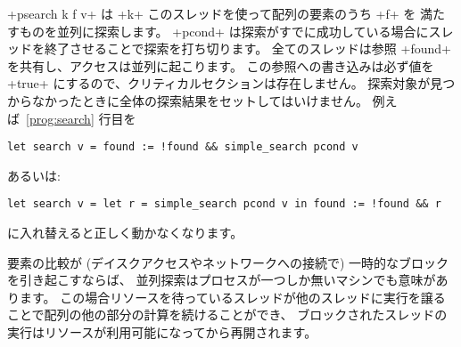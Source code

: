 \begin{example}
\ml+psearch k f v+ は \ml+k+ このスレッドを使って配列の要素のうち \ml+f+ を
満たすものを並列に探索します。
\ml+pcond+ は探索がすでに成功している場合にスレッドを終了させることで探索を打ち切ります。
全てのスレッドは参照 \ml+found+ を共有し、アクセスは並列に起こります。
この参照への書き込みは必ず値を \ml+true+ にするので、クリティカルセクションは存在しません。
探索対象が見つからなかったときに全体の探索結果をセットしてはいけません。
例えば~\ref{prog:search} 行目を
%
\begin{lstlisting}
let search v = found := !found && simple_search pcond v
\end{lstlisting}
%
あるいは:
%
\begin{lstlisting}
let search v = let r = simple_search pcond v in found := !found && r
\end{lstlisting}
%
に入れ替えると正しく動かなくなります。
\end{example}
要素の比較が (デイスクアクセスやネットワークへの接続で) 一時的なブロックを引き起こすならば、
並列探索はプロセスが一つしか無いマシンでも意味があります。
この場合リソースを待っているスレッドが他のスレッドに実行を譲ることで配列の他の部分の計算を続けることができ、
ブロックされたスレッドの実行はリソースが利用可能になってから再開されます。

